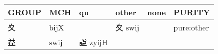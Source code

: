 \documentclass[14pt,a4paper]{scrartcl}
\begin{document}
\begin{longtable}[c]{@{}llllll@{}}
\toprule
\begin{minipage}[b]{0.14\columnwidth}\raggedright\strut
GROUP
\strut\end{minipage} &
\begin{minipage}[b]{0.14\columnwidth}\raggedright\strut
MCH
\strut\end{minipage} &
\begin{minipage}[b]{0.14\columnwidth}\raggedright\strut
qu
\strut\end{minipage} &
\begin{minipage}[b]{0.14\columnwidth}\raggedright\strut
other
\strut\end{minipage} &
\begin{minipage}[b]{0.14\columnwidth}\raggedright\strut
none
\strut\end{minipage} &
\begin{minipage}[b]{0.14\columnwidth}\raggedright\strut
PURITY
\strut\end{minipage}\tabularnewline
\midrule
\endhead
\begin{minipage}[t]{0.14\columnwidth}\raggedright\strut
夊
\strut\end{minipage} &
\begin{minipage}[t]{0.14\columnwidth}\raggedright\strut
bijX
\strut\end{minipage} &
\begin{minipage}[t]{0.14\columnwidth}\raggedright\strut
\strut\end{minipage} &
\begin{minipage}[t]{0.14\columnwidth}\raggedright\strut
夊 swij
\strut\end{minipage} &
\begin{minipage}[t]{0.14\columnwidth}\raggedright\strut
\strut\end{minipage} &
\begin{minipage}[t]{0.14\columnwidth}\raggedright\strut
pure:other
\strut\end{minipage}\tabularnewline
\begin{minipage}[t]{0.14\columnwidth}\raggedright\strut
益
\strut\end{minipage} &
\begin{minipage}[t]{0.14\columnwidth}\raggedright\strut
swij
\strut\end{minipage} &
\begin{minipage}[t]{0.14\columnwidth}\raggedright\strut
諡 zyijH
\strut\end{minipage} &
\begin{minipage}[t]{0.14\columnwidth}\raggedright\strut

\end{minipage}
\end{longtable}
\end{document}
